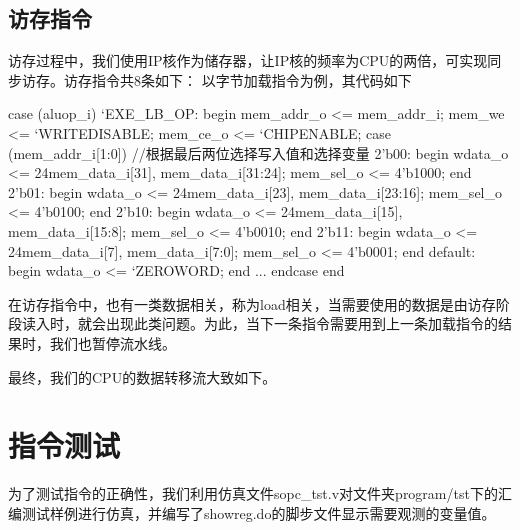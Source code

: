 \subsection{访存指令}
    访存过程中，我们使用IP核作为储存器，让IP核的频率为CPU的两倍，可实现同步访存。访存指令共8条如下：
    以字节加载指令为例，其代码如下
    \begin{verilog}
        case (aluop_i)
			`EXE_LB_OP: begin
                mem_addr_o <= mem_addr_i;
                mem_we <= `WRITEDISABLE;
                mem_ce_o <= `CHIPENABLE;
                case (mem_addr_i[1:0]) //根据最后两位选择写入值和选择变量
                    2'b00: begin
                        wdata_o <= {{24{mem_data_i[31]}}, mem_data_i[31:24]};
                        mem_sel_o <= 4'b1000;
                    end
                    2'b01: begin
                        wdata_o <= {{24{mem_data_i[23]}}, mem_data_i[23:16]};
                        mem_sel_o <= 4'b0100;
                    end
                    2'b10: begin
                        wdata_o <= {{24{mem_data_i[15]}}, mem_data_i[15:8]};
                        mem_sel_o <= 4'b0010;
                    end
                    2'b11: begin
                        wdata_o <= {{24{mem_data_i[7]}}, mem_data_i[7:0]};
                        mem_sel_o <= 4'b0001;
                    end
                    default: begin
                        wdata_o <= `ZEROWORD;
                    end
                ...
			endcase
        end
    \end{verilog}

    在访存指令中，也有一类数据相关，称为load相关，当需要使用的数据是由访存阶段读入时，就会出现此类问题。为此，当下一条指令需要用到上一条加载指令的结果时，我们也暂停流水线。

    最终，我们的CPU的数据转移流大致如下。

\section{指令测试}
    为了测试指令的正确性，我们利用仿真文件sopc\_tst.v对文件夹program/tst下的汇编测试样例进行仿真，并编写了showreg.do的脚步文件显示需要观测的变量值。

